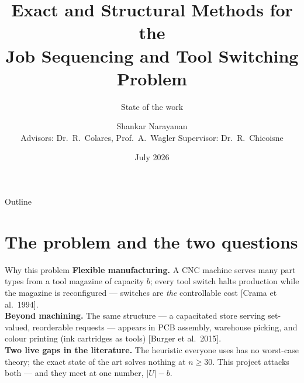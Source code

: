 \documentclass[10pt]{beamer}
\title[Sequencing and Tool Switching]{Exact and Structural Methods for the\\ Job Sequencing and Tool Switching Problem}
\subtitle{State of the work}
\author[S.~Narayanan]{Shankar Narayanan\\[2mm]{\small Advisors: Dr.\ R.~Colares, Prof.\ A.~Wagler \quad Supervisor: Dr.\ R.~Chicoisne}}
\institute[UCA -- ISIMA -- LIMOS]{Universit\'e Clermont Auvergne \;$\cdot$\; INP ISIMA \;$\cdot$\; LIMOS\\[1mm]
{\scriptsize\url{https://github.com/shankar-n/JGP-SSP-Codes-Shankar}}}
\date{July 2026}
\newcommand{\U}{U}\newcommand{\Kst}{K^{\ast}}\newcommand{\Zst}{Z^{\ast}}
\begin{document}
\begin{frame}\titlepage
{}
\end{frame}

\begin{frame}{Outline}\tableofcontents\end{frame}

\section{The problem and the two questions}
\begin{frame}{Why this problem}
\textbf{Flexible manufacturing.} A CNC machine serves many part types from a
tool magazine of capacity $b$; every tool switch halts production while the
magazine is reconfigured --- switches are \emph{the} controllable cost
{\footnotesize[Crama et al.\ 1994]}.\\[2mm]
\textbf{Beyond machining.} The same structure --- a capacitated store serving
set-valued, reorderable requests --- appears in PCB assembly, warehouse
picking, and colour printing (ink cartridges as tools)
{\footnotesize[Burger et al.\ 2015]}.\\[2mm]
\textbf{Two live gaps in the literature.} The heuristic everyone uses has no
worst-case theory; the exact state of the art solves nothing at $n\ge30$.
This project attacks both --- and they meet at one number, $|\U|-b$.
\end{frame}
\end{document}
